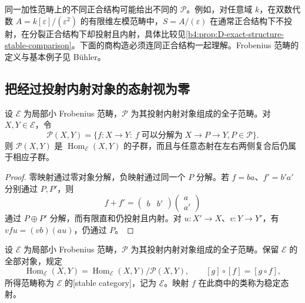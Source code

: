 同一加性范畴上的不同正合结构可能给出不同的 \(\mathcal P\)。例如，对任意域 \(k\)，在双数代数 \(A=k[\varepsilon]/(\varepsilon^2)\) 的有限维左模范畴中，\(S=A/(\varepsilon)\) 在通常正合结构下不投射，在分裂正合结构下却投射且内射，具体比较见\cref{b4:prop:D-exact-structure-stable-comparison}。下面的商构造必须连同正合结构一起理解。Frobenius 范畴的定义与基本例子见 Bühler\cite[Section 13.4]{Buehler2010ExactCategories}。

\subsection{把经过投射内射对象的态射视为零}
\label{b4:subsec:D01:02}

\begin{proposition}\label{b4:prop:D-projective-ideal}
	设 \(\mathcal E\) 为局部小 Frobenius 范畴，\(\mathcal P\) 为其投射内射对象组成的全子范畴。对 \(X,Y\in\mathcal E\)，令
	\[
		\mathcal P(X,Y)= \{f:X\to Y:\ f\;\text{可以分解为}\;X\to P\to Y, P\in\mathcal P\}.
	\]
	则 \(\mathcal P(X,Y)\) 是 \(\operatorname{Hom}_{\mathcal E}(X,Y)\) 的子群，而且与任意态射在左右两侧复合后仍属于相应子群。
\end{proposition}
\begin{proof}
	零映射通过零对象分解，负映射通过同一个 \(P\) 分解。若 \(f=ba\)、\(f'=b'a'\) 分别通过 \(P,P'\)，则
	\[
		f+f'=
		\begin{pmatrix}b&b'\end{pmatrix}
		\begin{pmatrix}a\\a'\end{pmatrix}
	\]
	通过 \(P\oplus P'\) 分解，而有限直和仍投射且内射。对 \(u:X'\to X\)、\(v:Y\to Y'\)，有 \(vfu=(vb)(au)\)，仍通过 \(P\)。
\end{proof}

\begin{definition}\label{b4:def:D-stable-category}
	设 \(\mathcal E\) 为局部小 Frobenius 范畴，\(\mathcal P\) 为其投射内射对象组成的全子范畴。保留 \(\mathcal E\) 的全部对象，规定
	\[
		\operatorname{Hom}_{\underline{\mathcal E}}(X,Y) =\operatorname{Hom}_{\mathcal E}(X,Y)/\mathcal P(X,Y), \qquad [g]\circ[f]=[g\circ f],
	\]
	所得范畴称为 \(\mathcal E\) 的[stable category]，记为 \(\underline{\mathcal E}\)。映射 \(f\) 在此商中的类称为稳定态射。
\end{definition}

